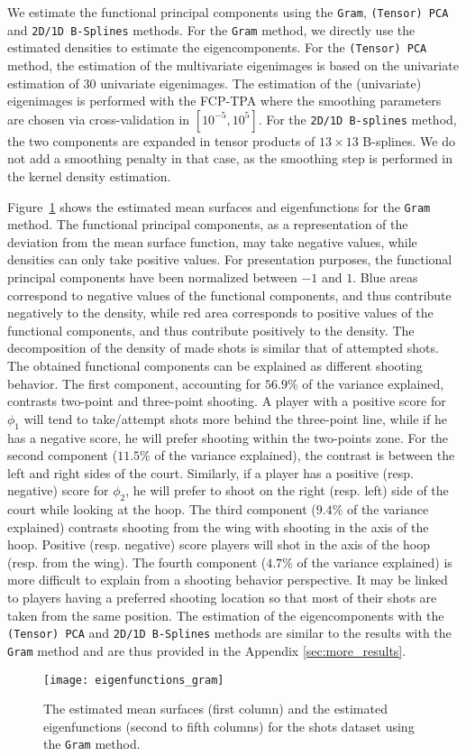 We estimate the functional principal components using the \texttt{Gram}, \texttt{(Tensor) PCA} and \texttt{2D/1D B-Splines} methods. For the \texttt{Gram} method, we directly use the estimated densities to estimate the eigencomponents. For the \texttt{(Tensor) PCA} method, the estimation of the multivariate eigenimages is based on the univariate estimation of $30$ univariate eigenimages. The estimation of the (univariate) eigenimages is performed with the FCP-TPA where the smoothing parameters are chosen via cross-validation in $[10^{-5}, 10^5]$. For the \texttt{2D/1D B-splines} method, the two components are expanded in tensor products of $13 \times 13$ B-splines. We do not add a smoothing penalty in that case, as the smoothing step is performed in the kernel density estimation.

Figure~\ref{fig:eigenfunctions_gram} shows the estimated mean surfaces and eigenfunctions for the \texttt{Gram} method. The functional principal components, as a representation of the deviation from the mean surface function, may take negative values, while densities can only take positive values. For presentation purposes, the functional principal components have been normalized between $-1$ and $1$. Blue areas correspond to negative values of the functional components, and thus contribute negatively to the density, while red area corresponds to positive values of the functional components, and thus contribute positively to the density. The decomposition of the density of made shots is similar that of attempted shots. The obtained functional components can be explained as different shooting behavior. The first component, accounting for $56.9\%$ of the variance explained, contrasts two-point and three-point shooting. A player with a positive score for $\phi_1$ will tend to take/attempt shots more behind the three-point line, while if he has a negative score, he will prefer shooting within the two-points zone. For the second component ($11.5\%$ of the variance explained), the contrast is between the left and right sides of the court. Similarly, if a player has a positive (resp. negative) score for $\phi_2$, he will prefer to shoot on the right (resp. left) side of the court while looking at the hoop. The third component ($9.4\%$ of the variance explained) contrasts shooting from the wing with shooting in the axis of the hoop. Positive (resp. negative) score players will shot in the axis of the hoop (resp. from the wing). The fourth component ($4.7\%$ of the variance explained) is more difficult to explain from a shooting behavior perspective. It may be linked to players having a preferred shooting location so that most of their shots are taken from the same position. The estimation of the eigencomponents with the \texttt{(Tensor) PCA} and \texttt{2D/1D B-Splines} methods are similar to the results with the \texttt{Gram} method and are thus provided in the Appendix \ref{sec:more_results}. 
\begin{figure}
    \centering
    \texttt{[image: eigenfunctions\_gram]}
    \caption{The estimated mean surfaces (first column) and the estimated eigenfunctions (second to fifth columns) for the shots dataset using the \texttt{Gram} method.}
    \label{fig:eigenfunctions_gram}
\end{figure}
